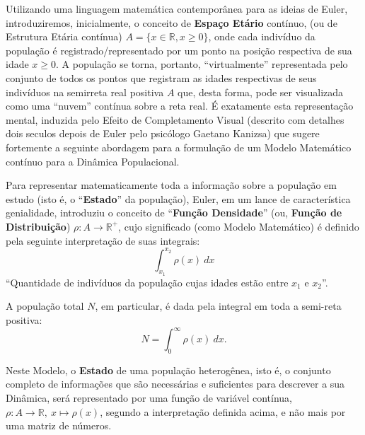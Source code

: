 Utilizando uma linguagem matemática contemporânea para as ideias de Euler, introduziremos, inicialmente, o conceito de \textbf{Espaço Etário} contínuo, (ou de Estrutura Etária contínua) \(A = \{x \in \mathbb{R}, x \ge 0\}\), onde cada indivíduo da população é registrado/representado por um ponto na posição respectiva de sua idade \(x \ge 0\). A população se torna, portanto, ``virtualmente'' representada pelo conjunto de todos os pontos que registram as idades respectivas de seus indivíduos na semirreta real positiva \(A\) que, desta forma, pode ser visualizada como uma ``nuvem'' contínua sobre a reta real. É exatamente esta representação mental, induzida pelo Efeito de Completamento Visual (descrito com detalhes dois seculos depois de Euler pelo psicólogo Gaetano Kanizsa) que sugere fortemente a seguinte abordagem para a formulação de um Modelo Matemático contínuo para a Dinâmica Populacional.

Para representar matematicamente toda a informação sobre a população em estudo (isto é, o ``\textbf{Estado}'' da população), Euler, em um lance de característica genialidade, introduziu o conceito de ``\textbf{Função Densidade}'' (ou, \textbf{Função de Distribuição}) \(\rho: A \to \mathbb{R}^{+}\), cujo significado (como Modelo Matemático) é definido pela seguinte interpretação de suas integrais:
\[\displaystyle\int_{x_1}^{x_2} \rho(x)\ dx\] ``Quantidade de indivíduos da população cujas idades estão entre \(x_1\) e \(x_2\)''.

A população total \(N\), em particular, é dada pela integral em toda a semi-reta positiva:
\[N = \displaystyle\int_{0}^{\infty} \rho(x)\ dx.\]

Neste Modelo, o \textbf{Estado} de uma população heterogênea, isto é, o conjunto completo de informações que são necessárias e suficientes para descrever a sua Dinâmica, será representado por uma função de variável contínua, \(\rho: A \to \mathbb{R},\ x \mapsto \rho(x)\), segundo a interpretação definida acima, e não mais por uma matriz de números.




